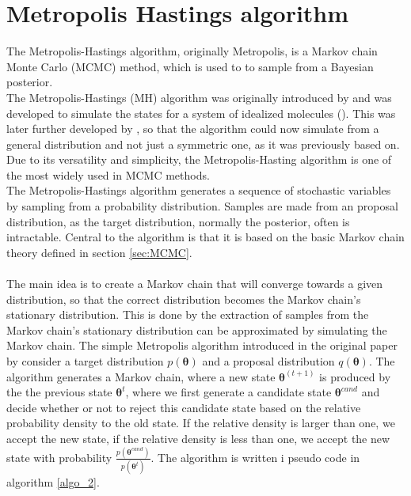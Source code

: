 \section{Metropolis Hastings algorithm} \label{sec:Metropolis_Hastings}

The Metropolis-Hastings algorithm, originally Metropolis, is a Markov chain Monte Carlo (MCMC) method, which is used to to sample from a Bayesian posterior. \\
The Metropolis-Hastings (MH) algorithm was originally introduced by \cite{Metropolis1953} and was developed to simulate the states for a system of idealized molecules (\cite{neal2012mcmc}). This was later further developed by \cite{hastings70}, so that the algorithm could now simulate from a general distribution and not just a symmetric one, as it was previously based on. Due to its versatility and simplicity, the Metropolis-Hasting algorithm is one of the most widely used in MCMC methods.
\\
The Metropolis-Hastings algorithm generates a sequence of stochastic variables by sampling from a probability distribution. Samples are made from an proposal distribution, as the target distribution, normally the posterior, often is intractable. Central to the algorithm is that it is based on the basic Markov chain theory defined in section \ref{sec:MCMC}.\\
\\
The main idea is to create a Markov chain that will converge towards a given distribution, so that the correct distribution becomes the Markov chain's stationary distribution. This is done by the extraction of samples from the Markov chain's stationary distribution can be approximated by simulating the Markov chain. The simple Metropolis algorithm introduced in the original paper by \cite{Metropolis1953} consider a target distribution $p(\boldsymbol{\theta})$ and a proposal distribution $q(\boldsymbol{\theta})$. The algorithm generates a Markov chain, where a new state $\boldsymbol{\theta}^{(t+1)}$ is produced by the the previous state $\boldsymbol{\theta}^t$, where we first generate a candidate state $\boldsymbol{\theta}^{cand}$ and decide whether or not to reject this candidate state based on the relative probability density to the old state. If the relative density is larger than one, we accept the new state, if the relative density is less than one, we accept the new state with probability $\frac{p(\boldsymbol{\theta}^{cand})}{p(\boldsymbol{\theta}^{t})}$. The algorithm is written i pseudo code in algorithm \ref{algo_2}.

